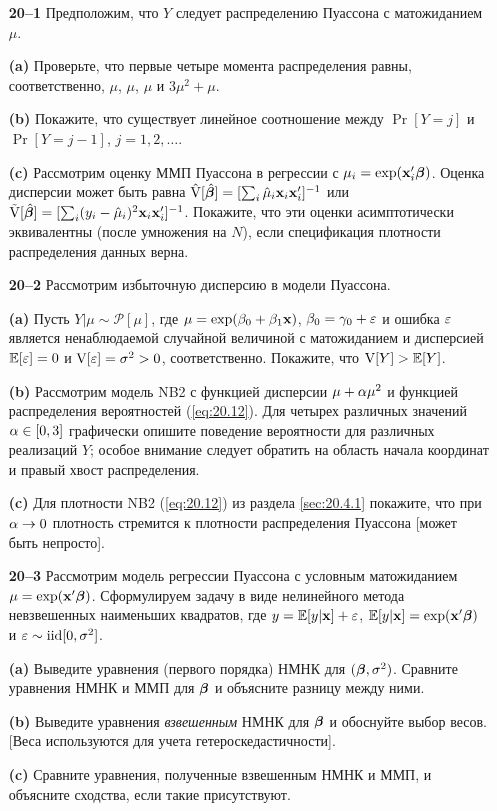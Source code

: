 \noindent
\begin{itemize}
    \item[\textbf{20--1}]
Предположим, что $Y$ следует распределению Пуассона с матожиданием $\mu$.
        \item[\textbf{(a)}]
Проверьте, что первые четыре момента распределения равны, соответственно, $\mu$, $\mu$, $\mu$ и $3\mu^2 + \mu$.
        \item[\textbf{(b)}]
Покажите, что существует линейное соотношение между $\Pr[Y = j]$ и $\Pr[Y = j - 1]$, $j = 1, 2, \ldots $.
        \item[\textbf{(c)}]
Рассмотрим оценку ММП Пуассона в регрессии с $\mu_i = \exp(\mathbf{x}_i'\bm{\beta})$. Оценка дисперсии может быть равна $\hat{\mathrm{V}}[\hat{\bm{\beta}}] = [\sum_i \hat{\mu}_i \mathbf{x}_i \mathbf{x}'_i]^{-1}$ или $\tilde{\mathrm{V}}[\hat{\bm{\beta}}] = [\sum_i (y_i - \hat{\mu}_i)^2 \mathbf{x}_i \mathbf{x}'_i]^{-1}$.
Покажите, что эти оценки асимптотически эквивалентны (после умножения на $N$), если спецификация плотности распределения данных верна.

    \item[\textbf{20--2}]
Рассмотрим избыточную дисперсию в модели Пуассона.
        \item[\textbf{(a)}]
Пусть $Y|\mu \sim \mathcal{P}[\mu]$, где $\mu = \exp(\beta_0 + \beta_1\mathbf{x})$, $\beta_0 = \gamma_0 + \varepsilon$ и ошибка $\varepsilon$ является ненаблюдаемой случайной величиной с матожиданием и дисперсией $\mathbb{E}[\varepsilon] = 0$ и $\mathrm{V}[\varepsilon] = \sigma^2 > 0$, соответственно. Покажите, что $\mathrm{V}[Y] > \mathbb{E}[Y]$.
        \item[\textbf{(b)}]
Рассмотрим модель NB2 с функцией дисперсии $\mu + \alpha \mu^2$ и функцией распределения вероятностей (\ref{eq:20.12}). Для четырех различных значений $\alpha \in [0, 3]$ графически опишите поведение вероятности для различных реализаций $Y$; особое внимание следует обратить на область начала координат и правый хвост распределения.
        \item[\textbf{(c)}]
Для плотности NB2 (\ref{eq:20.12}) из раздела \ref{sec:20.4.1} покажите, что при $\alpha \rightarrow 0$ плотность стремится к плотности распределения Пуассона [может быть непросто].

    \item[\textbf{20--3}]
Рассмотрим модель регрессии Пуассона с условным матожиданием $\mu = \exp(\mathbf{x}'\bm{\beta})$. Сформулируем задачу в виде нелинейного метода невзвешенных наименьших квадратов, где $y = \mathbb{E}[y|\mathbf{x}] + \varepsilon$, $\mathbb{E}[y|\mathbf{x}] = \exp(\mathbf{x}'\bm{\beta})$ и $\varepsilon \sim \mathrm{iid}[0, \sigma^2]$.
        \item[\textbf{(a)}]
Выведите уравнения (первого порядка) НМНК для $(\bm{\beta}, \sigma^2)$. Сравните уравнения НМНК и ММП для $\bm{\beta}$ и объясните разницу между ними.
        \item[\textbf{(b)}]
Выведите уравнения \textit{взвешенным} НМНК для $\bm{\beta}$ и обоснуйте выбор весов. [Веса используются для учета гетероскедастичности].
        \item[\textbf{(c)}]
Сравните уравнения, полученные взвешенным НМНК и ММП, и объясните сходства, если такие присутствуют.


\end{itemize}
